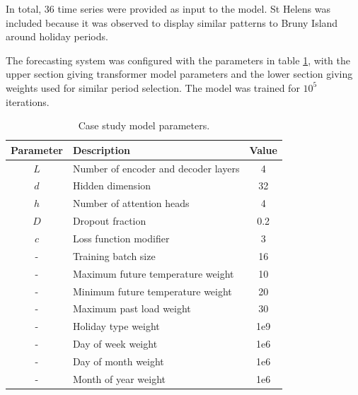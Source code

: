 In total, 36 time series were provided as input to the model.
St Helens was included because it was observed to display similar patterns to Bruny Island around holiday periods.

The forecasting system was configured with the parameters in table \ref{table:parameters}, with the upper section giving transformer model parameters and the lower section giving weights used for similar period selection.
The model was trained for $10^5$ iterations.

\begin{table}[htbp]
	\caption{Case study model parameters.}
	\begin{center}
		\begin{tabular}{clc}
			\textbf{Parameter}&\textbf{Description}&\textbf{Value} \\
			\hline
			$L$ & Number of encoder and decoder layers & 4 \\
			$d$ & Hidden dimension & 32 \\
			$h$ & Number of attention heads & 4 \\
			$D$ & Dropout fraction & 0.2 \\
			$c$ & Loss function modifier & 3 \\
			-   & Training batch size & 16 \\
			\hline
			-   & Maximum future temperature weight & 10 \\
			-   & Minimum future temperature weight & 20 \\
			-   & Maximum past load weight & 30 \\
			-   & Holiday type weight & 1e9 \\
			-   & Day of week weight & 1e6 \\
			-   & Day of month weight & 1e6 \\
			-   & Month of year weight & 1e6 \\
			
		\end{tabular}
		\label{table:parameters}
	\end{center}
\end{table}

